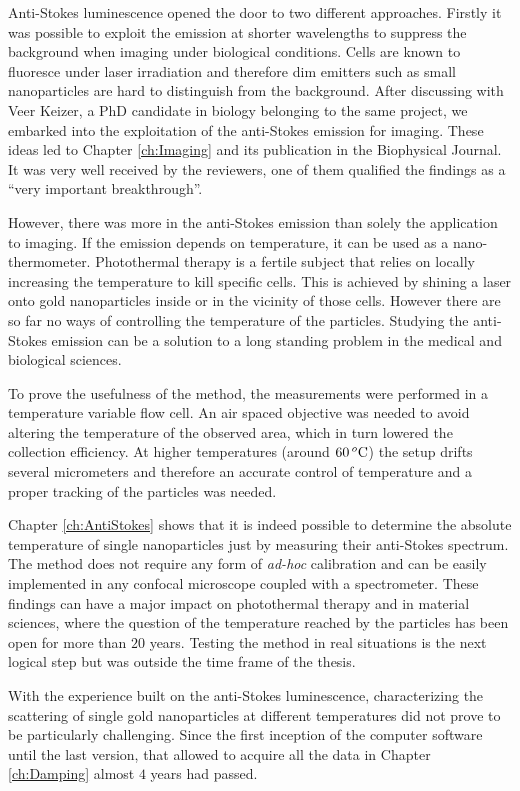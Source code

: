 Anti-Stokes luminescence opened the door to two different approaches. Firstly it
was possible to exploit the emission at shorter wavelengths to suppress the
background when imaging under biological conditions. Cells are known to
fluoresce under laser irradiation and therefore dim emitters such as small nanoparticles
are hard to distinguish from the background. After discussing with Veer Keizer,
a PhD candidate in biology belonging to the same project, we embarked into the
exploitation of the anti-Stokes emission for imaging. These ideas led to
Chapter \ref{ch:Imaging} and its publication in the Biophysical Journal. It was
very well received by the reviewers, one of them qualified the findings as
a ``very important breakthrough''.

However, there was more in the anti-Stokes emission than solely the application
to imaging. If the emission depends on temperature, it can be used as a
nano-thermometer. Photothermal therapy is a fertile subject that relies on
locally increasing the temperature to kill specific cells. This is achieved by
shining a laser onto gold nanoparticles inside or in the vicinity of those
cells. However there are so far no ways of controlling the temperature of the
particles. Studying the anti-Stokes emission can be a solution to a long
standing problem in the medical and biological sciences.

To prove the usefulness of the method, the measurements were performed in a
temperature variable flow cell. An air spaced objective was needed to avoid
altering the temperature of the observed area, which in turn lowered the
collection efficiency. At higher temperatures (around $60\,^o\textrm{C}$) the setup
drifts several micrometers and therefore an accurate control of temperature and
a proper tracking of the particles was needed. 

Chapter \ref{ch:AntiStokes} shows that it is indeed possible to determine the
absolute temperature of single nanoparticles just by measuring their anti-Stokes
spectrum. The method does not require any form of \textit{ad-hoc} calibration
and can be easily implemented in any confocal microscope coupled with a
spectrometer. These findings can have a major impact on photothermal therapy and
in material sciences, where the question of the temperature reached by the
particles has been open for more than $20$ years. Testing the method in real
situations is the next logical step but was outside the time frame of the
thesis.

With the experience built on the anti-Stokes luminescence, characterizing the
scattering of single gold nanoparticles at different temperatures did not prove
to be particularly challenging. Since the first inception of the computer
software until the last version, that allowed to acquire all the data in Chapter
\ref{ch:Damping} almost $4$ years had passed. 

